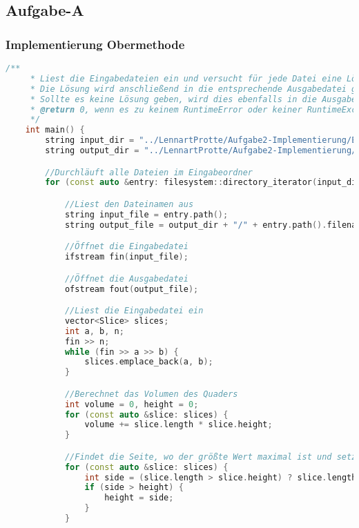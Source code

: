 \documentclass[a4paper,10pt,ngerman]{scrartcl}
\begin{document}
    \newpage

    \subsection{Aufgabe-A}\label{subsec:alles-kaese}

    \subsubsection{Implementierung Obermethode}
    \begin{lstlisting}[frame=single,language=C++,title=Methode main,breaklines=true,label={lst:code_main}]
    /**
     * Liest die Eingabedateien ein und versucht für jede Datei eine Lösung entsprechend der Aufgabenstellung zu finden
     * Die Lösung wird anschließend in die entsprechende Ausgabedatei geschrieben
     * Sollte es keine Lösung geben, wird dies ebenfalls in die Ausgabedatei geschrieben
     * @return 0, wenn es zu keinem RuntimeError oder keiner RuntimeException gekommen ist
     */
    int main() {
        string input_dir = "../LennartProtte/Aufgabe2-Implementierung/Eingabedateien";
        string output_dir = "../LennartProtte/Aufgabe2-Implementierung/Ausgabedateien";

        //Durchläuft alle Dateien im Eingabeordner
        for (const auto &entry: filesystem::directory_iterator(input_dir)) {

            //Liest den Dateinamen aus
            string input_file = entry.path();
            string output_file = output_dir + "/" + entry.path().filename().string();

            //Öffnet die Eingabedatei
            ifstream fin(input_file);

            //Öffnet die Ausgabedatei
            ofstream fout(output_file);

            //Liest die Eingabedatei ein
            vector<Slice> slices;
            int a, b, n;
            fin >> n;
            while (fin >> a >> b) {
                slices.emplace_back(a, b);
            }

            //Berechnet das Volumen des Quaders
            int volume = 0, height = 0;
            for (const auto &slice: slices) {
                volume += slice.length * slice.height;
            }

            //Findet die Seite, wo der größte Wert maximal ist und setzt die Länge auf diesen Wert
            for (const auto &slice: slices) {
                int side = (slice.length > slice.height) ? slice.length : slice.height;
                if (side > height) {
                    height = side;
                }
            }


\end{lstlisting}
\end{document}
